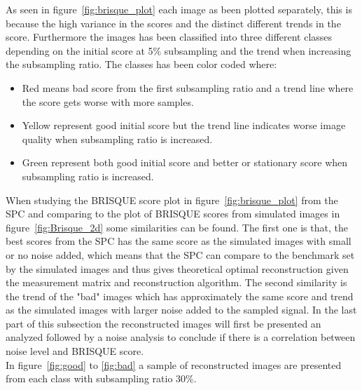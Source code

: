 As seen in figure~\ref{fig:brisque_plot} each image as been plotted separately, this is because the high variance in the scores and the distinct different trends in the score. Furthermore the images has been classified into three different classes depending on the initial score at 5\% subsampling and the trend when increasing the subsampling ratio. The classes has been color coded where:

\begin{itemize}
\item Red means bad score from the first subsampling ratio and a trend line where the score gets worse with more samples.
\item Yellow represent good initial score but the trend line indicates worse image quality when subsampling ratio is increased.
\item Green represent both good initial score and better or stationary score when subsampling ratio is increased. 
\end{itemize}

When studying the BRISQUE score plot in figure~\ref{fig:brisque_plot} from the SPC and comparing to the plot of BRISQUE scores from simulated images in figure~\ref{fig:Brisque_2d} some similarities can be found. The first one is that, the best scores from the SPC has the same score as the simulated images with small or no noise added, which means that the SPC can compare to the benchmark set by the simulated images and thus gives theoretical optimal reconstruction given the measurement matrix and reconstruction algorithm. The second similarity is the trend of the "bad" images which has approximately the same score and trend as the simulated images with larger noise added to the sampled signal. In the last part of this subsection the reconstructed images will first be presented an analyzed followed by a noise analysis to conclude if there is a correlation between noise level and BRISQUE score.\\[0.1in] 


In figure~\ref{fig:good} to \ref{fig:bad} a sample of reconstructed  images are presented from each class with subsampling ratio 30\%. 




